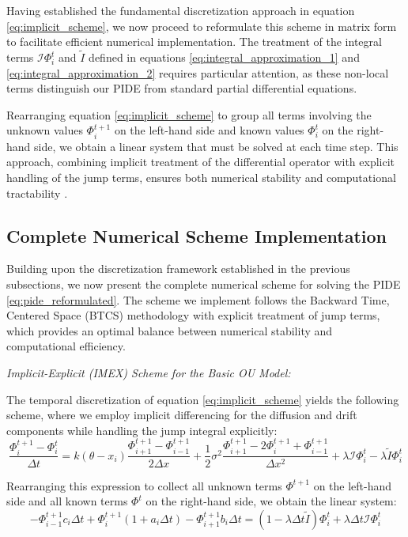\documentclass[11pt,twoside,openright]{report}
\begin{document}
Having established the fundamental discretization approach in equation \eqref{eq:implicit_scheme}, we now proceed to reformulate this scheme in matrix form to facilitate efficient numerical implementation. The treatment of the integral terms $\mathcal{I}\Phi^t_i$ and $\tilde{I}$ defined in equations \eqref{eq:integral_approximation_1} and \eqref{eq:integral_approximation_2} requires particular attention, as these non-local terms distinguish our PIDE from standard partial differential equations.

Rearranging equation \eqref{eq:implicit_scheme} to group all terms involving the unknown values $\Phi^{t+1}_i$ on the left-hand side and known values $\Phi^t_i$ on the right-hand side, we obtain a linear system that must be solved at each time step. This approach, combining implicit treatment of the differential operator with explicit handling of the jump terms, ensures both numerical stability and computational tractability \cite{georgiou2023thesis}.

\subsection{Complete Numerical Scheme Implementation}

Building upon the discretization framework established in the previous subsections, we now present the complete numerical scheme for solving the PIDE \eqref{eq:pide_reformulated}. The scheme we implement follows the Backward Time, Centered Space (BTCS) methodology with explicit treatment of jump terms, which provides an optimal balance between numerical stability and computational efficiency.

\textit{Implicit-Explicit (IMEX) Scheme for the Basic OU Model:}

The temporal discretization of equation \eqref{eq:implicit_scheme} yields the following scheme, where we employ implicit differencing for the diffusion and drift components while handling the jump integral explicitly:
$$ \frac{\Phi^{t+1}_i - \Phi^t_i}{\Delta t} = k(\theta - x_i)\frac{\Phi^{t+1}_{i+1} - \Phi^{t+1}_{i-1}}{2\Delta x} + \frac{1}{2}\sigma^2 \frac{\Phi^{t+1}_{i+1} - 2\Phi^{t+1}_i + \Phi^{t+1}_{i-1}}{\Delta x^2} + \lambda\mathcal{I}\Phi^t_i - \lambda\tilde{I}\Phi^t_i $$

Rearranging this expression to collect all unknown terms $\Phi^{t+1}$ on the left-hand side and all known terms $\Phi^t$ on the right-hand side, we obtain the linear system:
$$ -\Phi^{t+1}_{i-1} c_i \Delta t + \Phi^{t+1}_i (1 + a_i \Delta t) - \Phi^{t+1}_{i+1} b_i \Delta t = (1 - \lambda \Delta t \tilde{I})\Phi^t_i + \lambda \Delta t \mathcal{I}\Phi^t_i $$
\end{document}
